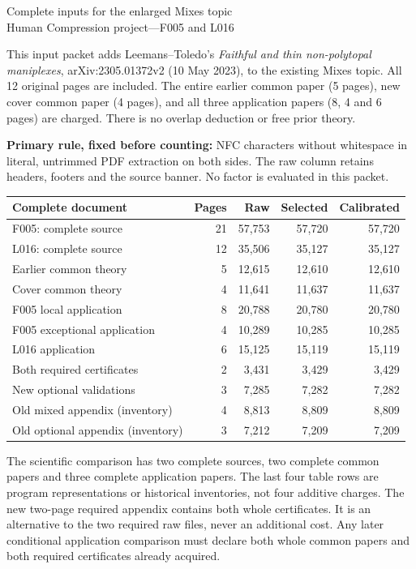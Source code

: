 \documentclass[a4paper,11pt]{article}
\begin{document}
\begin{center}{\Large Complete inputs for the enlarged Mixes topic}\\[4pt]
Human Compression project\quad---\quad F005 and L016\end{center}
This input packet adds Leemans--Toledo's \emph{Faithful and thin non-polytopal
maniplexes}, arXiv:2305.01372v2 (10 May 2023), to the existing Mixes topic.
All 12 original pages are included. The entire earlier common paper (5 pages),
new cover common paper (4 pages), and all three application papers (8, 4 and
6 pages) are charged. There is no overlap deduction or free prior theory.

\textbf{Primary rule, fixed before counting:} NFC characters without whitespace
in literal, untrimmed PDF extraction on both sides. The raw column retains
headers, footers and the source banner. No factor is evaluated in this packet.

\begin{center}\small
\begin{tabular}{@{}p{72mm}rrrr@{}}\toprule
Complete document & Pages & Raw & Selected & Calibrated\\\midrule
F005: complete source & 21 & 57,753 & 57,720 & 57,720 \\
L016: complete source & 12 & 35,506 & 35,127 & 35,127 \\
Earlier common theory & 5 & 12,615 & 12,610 & 12,610 \\
Cover common theory & 4 & 11,641 & 11,637 & 11,637 \\
F005 local application & 8 & 20,788 & 20,780 & 20,780 \\
F005 exceptional application & 4 & 10,289 & 10,285 & 10,285 \\
L016 application & 6 & 15,125 & 15,119 & 15,119 \\
Both required certificates & 2 & 3,431 & 3,429 & 3,429 \\
New optional validations & 3 & 7,285 & 7,282 & 7,282 \\
Old mixed appendix (inventory) & 4 & 8,813 & 8,809 & 8,809 \\
Old optional appendix (inventory) & 3 & 7,212 & 7,209 & 7,209 \\
\bottomrule\end{tabular}\end{center}

The scientific comparison has two complete sources, two complete common
papers and three complete application papers. The last four table rows are
program representations or historical inventories, not four additive charges.
The new two-page required appendix contains both whole certificates. It is an
alternative to the two required raw files, never an additional cost. Any later
conditional application comparison must declare both whole common papers and
both required certificates already acquired.
\end{document}
